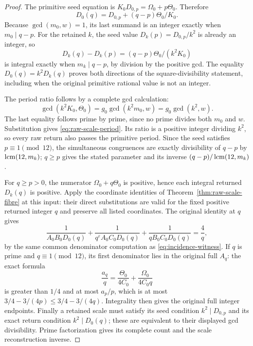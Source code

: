 \begin{proof}
The primitive seed equation is
\(K_0D_{0,p}=\Omega_0+p\Theta_0\).  Therefore
\[
 D_0(q)=D_{0,p}+(q-p)\Theta_0/K_0.
\]
Because \(\gcd(m_0,w)=1\), its last summand is an integer
exactly when \(m_0\mid q-p\).  For the retained \(k\), the
seed value \(D_k(p)=D_{0,p}/k^2\) is already an integer, so
\[
 D_k(q)-D_k(p)=(q-p)\Theta_0/(k^2K_0)
\]
is integral exactly when \(m_k\mid q-p\), by division by the
positive gcd.  The equality \(D_0(q)=k^2D_k(q)\) proves both
directions of the square-divisibility statement, including when
the original primitive rational value is not an integer.

The period ratio follows by a complete gcd calculation:
\[
 \gcd(k^2K_0,\Theta_0)
 =g_0\gcd(k^2m_0,w)=g_0\gcd(k^2,w).
\]
The last equality follows prime by prime, since no prime divides
both \(m_0\) and \(w\).  Substitution gives
\eqref{eq:raw-scale-period}.  Its ratio is a positive integer
dividing \(k^2\), so every raw return also passes the primitive
period.  Since the seed satisfies \(p\equiv1\pmod{12}\),
the simultaneous congruences are exactly divisibility of \(q-p\)
by \(\operatorname{lcm}(12,m_k)\); \(q\ge p\) gives the stated parameter
and its inverse \((q-p)/\operatorname{lcm}(12,m_k)\).

For \(q\ge p>0\), the numerator \(\Omega_0+q\Theta_0\) is
positive, hence each integral returned \(D_k(q)\) is positive.
Apply the coordinate identities of Theorem~\ref{thm:raw-scale-fibre}
at this input: their direct substitutions are valid for the fixed
positive returned integer \(q\) and preserve all listed coordinates.
The original identity at \(q\) gives
\[
 \frac1{A_0B_0D_0(q)}+
 \frac1{q^\varepsilon A_0C_0D_0(q)}+
 \frac1{qB_0C_0D_0(q)}=\frac4q,
\]
by the same common denominator computation as
\eqref{eq:incidence-witness}.  If \(q\) is prime and
\(q\equiv1\pmod{12}\), its first denominator lies in the original
full \(A_q\): the exact formula
\[
 \frac{a_q}{q}=\frac{\Theta_0}{4C_0}
                       +\frac{\Omega_0}{4C_0q}
\]
is greater than \(1/4\) and at most \(a_p/p\), which is at most
\(3/4-3/(4p)\le3/4-3/(4q)\).
Integrality then gives the original full integer endpoints.
Finally a retained scale must satisfy its seed condition
\(k^2\mid D_{0,p}\) and its exact return condition
\(k^2\mid D_0(q)\); these are equivalent to their displayed gcd
divisibility.  Prime factorization gives its complete count and
the scale reconstruction inverse.
\end{proof}

